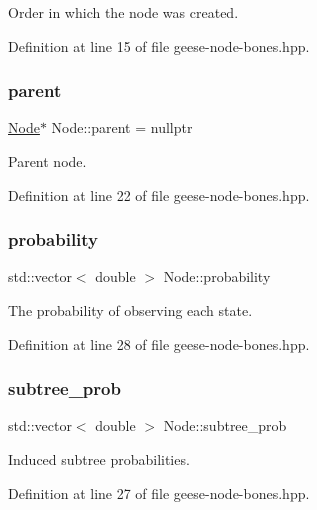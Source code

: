 Order in which the node was created. 



Definition at line 15 of file geese-\/node-\/bones.\+hpp.

\mbox{\label{class_node_ad8184598cdea70e4bbdfd76f2b0f9e85}} 
\subsubsection{\texorpdfstring{parent}{parent}}
{\footnotesize\ttfamily \hyperlink{class_node}{Node}$\ast$ Node\+::parent = nullptr}



Parent node. 



Definition at line 22 of file geese-\/node-\/bones.\+hpp.

\mbox{\label{class_node_a867d5e07f62da01392a817042c77735f}} 
\subsubsection{\texorpdfstring{probability}{probability}}
{\footnotesize\ttfamily std\+::vector$<$ double $>$ Node\+::probability}



The probability of observing each state. 



Definition at line 28 of file geese-\/node-\/bones.\+hpp.

\mbox{\label{class_node_afb0c9a29d8b65c33e9cec846e7d5811d}} 
\subsubsection{\texorpdfstring{subtree\+\_\+prob}{subtree\_prob}}
{\footnotesize\ttfamily std\+::vector$<$ double $>$ Node\+::subtree\+\_\+prob}



Induced subtree probabilities. 



Definition at line 27 of file geese-\/node-\/bones.\+hpp.

